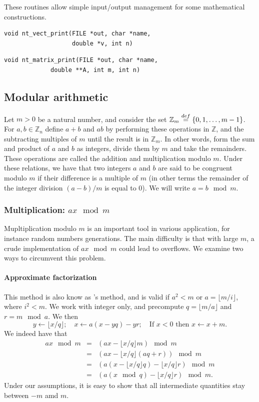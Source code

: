 These routines allow simple input/output management for some
mathematical constructions.
\begin{verbatim}
void nt_vect_print(FILE *out, char *name,
                   double *v, int n)
\end{verbatim}
\begin{verbatim}
void nt_matrix_print(FILE *out, char *name,
		     double **A, int m, int n)
\end{verbatim}

\subsection{Modular arithmetic}

Let $m>0$ be a natural number, and consider the set ${\mathbb{Z}}_m
\overset{def}{=}\{ 0,1,\ldots,m-1\}$.
For $a,b\in {\mathbb{Z}}_n$ define $a+b$ and $ab$ by performing these
operations in $\mathbb{Z}$, and the subtracting multiples of $m$ until
the result is in ${\mathbb{Z}}_m$.
In other words, form the sum and product of $a$ and $b$ as integers, divide
them by $m$ and take the remainders.
These operations are called the addition and multiplication modulo
$m$.
Under these relations, we have that two integers $a$ and $b$ are said
to be congruent modulo $m$ if their difference is a
multiple of $m$ (in other terms the remainder of the integer division
$(a-b)/m$ is equal to 0).
We will write $a = b \mod m$.

\subsubsection{Multiplication: $ax \mod m$}

Mupltiplication modulo $m$ is an important tool in various
application, for instance random numbers generations.
The main difficulty is that with large $m$, a crude implementation of
$ax \mod m$ could lead to overflows.
We examine two ways to circumvent this problem.

\paragraph{Approximate factorization}

This method is also know as 's method, and is valid if
$a^2 < m$ or $a = \lfloor m/i \rfloor$, where $i^2 < m$.
We work with integer only, and precompute ${q} = \lfloor m/a \rfloor$
and ${r} = m\mod a$.
We then 
\[
  y \leftarrow \lfloor x / q \rfloor; \quad
  x \leftarrow a (x - yq) - yr; \quad
  \mbox{If } x < 0 \mbox{ then } x \leftarrow x + m.
\]%
We indeed have that
\begin{eqnarray*}
  a x \mod m &=&  (ax - \lfloor x/q\rfloor m) \mod m \\
      &=&  (ax - \lfloor x/q\rfloor (a q + r)) \mod m \\
      &=&  (a (x - \lfloor x/q\rfloor q) - \lfloor x/q\rfloor r) \mod m \\
      &=&  (a (x \mod q) - \lfloor x/q\rfloor r) \mod m.
\end{eqnarray*}
Under our assumptions, it is easy to show that all intermediate
quantities stay between $-m$ amd $m$.

